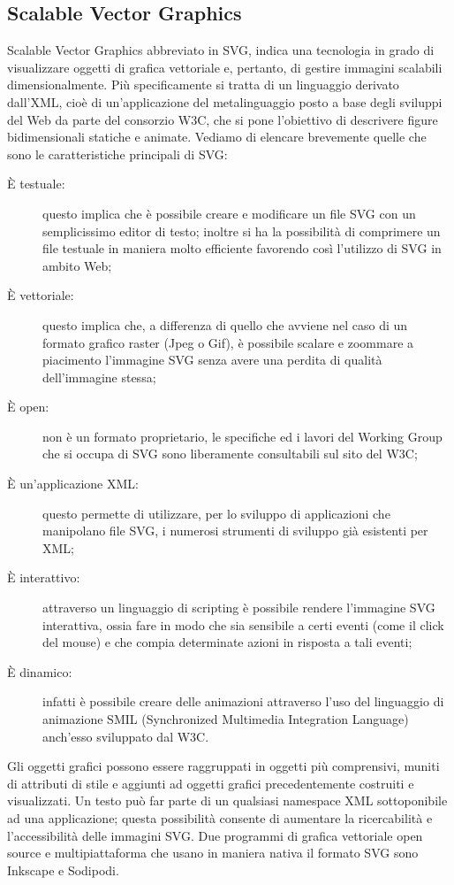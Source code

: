 \subsection{Scalable Vector Graphics}
Scalable Vector Graphics abbreviato in SVG, indica una tecnologia in grado di visualizzare oggetti di grafica vettoriale e, pertanto, di gestire immagini scalabili dimensionalmente.
Più specificamente si tratta di un linguaggio derivato dall'XML, cioè di un'applicazione del metalinguaggio posto a base degli sviluppi del Web da parte del consorzio W3C, che si pone l'obiettivo di descrivere figure bidimensionali statiche e animate.
Vediamo di elencare brevemente quelle che sono le caratteristiche principali di SVG:
\begin{description}
\item[È testuale:]questo implica che è possibile creare e modificare un file SVG con un semplicissimo editor di testo; inoltre si ha la possibilità di comprimere un file testuale in maniera molto efficiente favorendo così l’utilizzo di SVG in ambito Web;
\item[È vettoriale:]questo implica che, a differenza di quello che avviene nel caso di un formato grafico raster (Jpeg o Gif), è possibile scalare e zoommare a piacimento l’immagine SVG senza avere una perdita di qualità dell’immagine stessa;
\item[È open:]non è un formato proprietario, le specifiche ed i lavori del Working Group che si occupa di SVG sono liberamente consultabili sul sito del W3C;
\item[È un’applicazione XML:]questo permette di utilizzare, per lo sviluppo di applicazioni che manipolano file SVG, i numerosi strumenti di sviluppo già esistenti per XML;
\item[È interattivo:]attraverso un linguaggio di scripting è possibile rendere l’immagine SVG interattiva, ossia fare in modo che sia sensibile a certi eventi (come il click del mouse) e che compia determinate azioni in risposta a tali eventi;
\item[È dinamico:]infatti è possibile creare delle animazioni attraverso l’uso del linguaggio di animazione SMIL (Synchronized Multimedia Integration Language) anch’esso sviluppato dal W3C.
\end{description}

Gli oggetti grafici possono essere raggruppati in oggetti più comprensivi, muniti di attributi di stile e aggiunti ad oggetti grafici precedentemente costruiti e visualizzati. Un testo può far parte di un qualsiasi namespace XML sottoponibile ad una applicazione; questa possibilità consente di aumentare la ricercabilità e l'accessibilità delle immagini SVG.
Due programmi di grafica vettoriale open source e multipiattaforma che usano in maniera nativa il formato SVG sono Inkscape e Sodipodi.